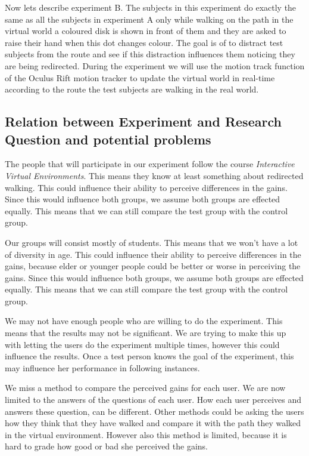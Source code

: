 Now lets describe experiment B. The subjects in this experiment do exactly the same as all the subjects in experiment A only while walking on the path in the virtual world a coloured disk is shown in front of them and they are asked to raise their hand when this dot changes colour. 
The goal is of to distract test subjects from the route and see if this distraction influences them noticing they are being redirected.
During the experiment we will use the motion track function of the Oculus Rift motion tracker to update the virtual world in real-time according to the route the test subjects are walking in the real world.

\subsection{Relation between Experiment and Research Question and potential problems}\label{sec:rel}
The people that will participate in our experiment follow the course \emph{Interactive Virtual Environments}.
This means they know at least something about redirected walking.
This could influence their ability to perceive differences in the gains.
Since this would influence both groups, we assume both groups are effected equally.
This means that we can still compare the test group with the control group.

Our groups will consist mostly of students.
This means that we won't have a lot of diversity in age.
This could influence their ability to perceive differences in the gains, because elder or younger people could be better or worse in perceiving the gains.
Since this would influence both groups, we assume both groups are effected equally.
This means that we can still compare the test group with the control group.

We may not have enough people who are willing to do the experiment.
This means that the results may not be significant.
We are trying to make this up with letting the users do the experiment multiple times, however this could influence the results.
Once a test person knows the goal of the experiment, this may influence her performance in following instances.

We miss a method to compare the perceived gains for each user.
We are now limited to the answers of the questions of each user.
How each user perceives and answers these question, can be different.
Other methods could be asking the users how they think that they have walked and compare it with the path they walked in the virtual environment.
However also this method is limited, because it is hard to grade how good or bad she perceived the gains.

